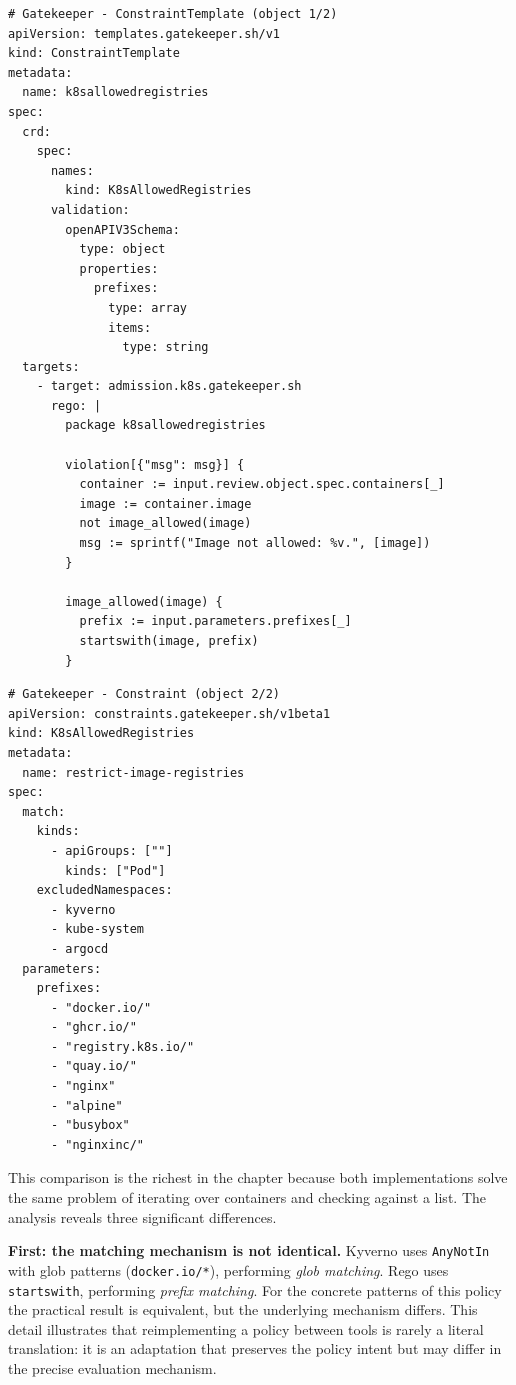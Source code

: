 \begin{lstlisting}
# Gatekeeper - ConstraintTemplate (object 1/2)
apiVersion: templates.gatekeeper.sh/v1
kind: ConstraintTemplate
metadata:
  name: k8sallowedregistries
spec:
  crd:
    spec:
      names:
        kind: K8sAllowedRegistries
      validation:
        openAPIV3Schema:
          type: object
          properties:
            prefixes:
              type: array
              items:
                type: string
  targets:
    - target: admission.k8s.gatekeeper.sh
      rego: |
        package k8sallowedregistries

        violation[{"msg": msg}] {
          container := input.review.object.spec.containers[_]
          image := container.image
          not image_allowed(image)
          msg := sprintf("Image not allowed: %v.", [image])
        }

        image_allowed(image) {
          prefix := input.parameters.prefixes[_]
          startswith(image, prefix)
        }
\end{lstlisting}

\begin{lstlisting}
# Gatekeeper - Constraint (object 2/2)
apiVersion: constraints.gatekeeper.sh/v1beta1
kind: K8sAllowedRegistries
metadata:
  name: restrict-image-registries
spec:
  match:
    kinds:
      - apiGroups: [""]
        kinds: ["Pod"]
    excludedNamespaces:
      - kyverno
      - kube-system
      - argocd
  parameters:
    prefixes:
      - "docker.io/"
      - "ghcr.io/"
      - "registry.k8s.io/"
      - "quay.io/"
      - "nginx"
      - "alpine"
      - "busybox"
      - "nginxinc/"
\end{lstlisting}

This comparison is the richest in the chapter because both implementations solve the same problem of iterating over containers and checking against a list. The analysis reveals three significant differences.

\textbf{First: the matching mechanism is not identical.} Kyverno uses \texttt{AnyNotIn} with glob patterns (\texttt{docker.io/*}), performing \textit{glob matching}. Rego uses \texttt{startswith}, performing \textit{prefix matching}. For the concrete patterns of this policy the practical result is equivalent, but the underlying mechanism differs. This detail illustrates that reimplementing a policy between tools is rarely a literal translation: it is an adaptation that preserves the policy intent but may differ in the precise evaluation mechanism.


